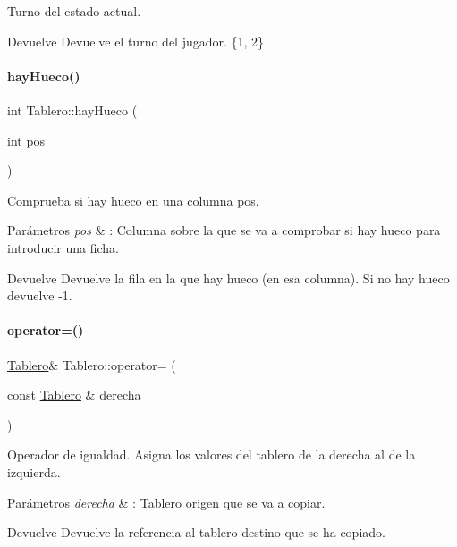 Turno del estado actual. 

\begin{DoxyReturn}{Devuelve}
Devuelve el turno del jugador. \{1, 2\} 
\end{DoxyReturn}
\hypertarget{classTablero_ada687d3c234c4fb416ca76461adf6ba4}{}\label{classTablero_ada687d3c234c4fb416ca76461adf6ba4} 
\paragraph{\texorpdfstring{hay\+Hueco()}{hayHueco()}}
{\footnotesize\ttfamily int Tablero\+::hay\+Hueco (\begin{DoxyParamCaption}\item[{int}]{pos }\end{DoxyParamCaption})}



Comprueba si hay hueco en una columna \textquotesingle{}pos\textquotesingle{}. 


\begin{DoxyParams}{Parámetros}
{\em pos} & \+: Columna sobre la que se va a comprobar si hay hueco para introducir una ficha. \\
\hline
\end{DoxyParams}
\begin{DoxyReturn}{Devuelve}
Devuelve la fila en la que hay hueco (en esa columna). Si no hay hueco devuelve -\/1. 
\end{DoxyReturn}
\hypertarget{classTablero_abd7c6bb5bc26c0500308848399e1fd4f}{}\label{classTablero_abd7c6bb5bc26c0500308848399e1fd4f} 
\paragraph{\texorpdfstring{operator=()}{operator=()}}
{\footnotesize\ttfamily \hyperlink{classTablero}{Tablero}\& Tablero\+::operator= (\begin{DoxyParamCaption}\item[{const \hyperlink{classTablero}{Tablero} \&}]{derecha }\end{DoxyParamCaption})}



Operador de igualdad. Asigna los valores del tablero de la derecha al de la izquierda. 


\begin{DoxyParams}{Parámetros}
{\em derecha} & \+: \hyperlink{classTablero}{Tablero} origen que se va a copiar. \\
\hline
\end{DoxyParams}
\begin{DoxyReturn}{Devuelve}
Devuelve la referencia al tablero destino que se ha copiado. 
\end{DoxyReturn}
\hypertarget{classTablero_a5de543f8186142731ab3ac77944a11b1}{}\label{classTablero_a5de543f8186142731ab3ac77944a11b1} 

